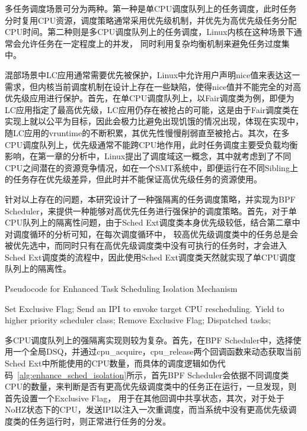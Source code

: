 多任务调度场景可分为两种。第一种是单CPU调度队列上的任务调度，此时任务分时复用CPU资源，调度策略通常采用优先级机制，并优先为高优先级任务分配CPU时间。第二种则是多CPU调度队列上的任务调度，Linux内核在这种场景下通常会允许任务在一定程度上的并发， 同时利用复杂均衡机制来避免任务过度集中。

混部场景中LC应用通常需要优先被保护，Linux中允许用户声明nice值来表达这一需求，但内核当前调度机制在设计上存在一些缺陷，使得nice值并不能完全的对高优先级应用进行保护。首先，在单CPU调度队列上，以Fair调度类为例，即便为LC应用指定了最高优先级，LC应用仍存在被抢占的可能，这是由于Fair调度类在实现上就以公平为目标，因此会极力比避免出现饥饿的情况出现，体现在实现中，随LC应用的vruntime的不断积累，其优先性慢慢削弱直至被抢占。其次，在多CPU调度队列上，优先级通常不能跨CPU地作用，此时任务调度主要受负载均衡影响，在第一章的分析中，Linux提出了调度域这一概念，其中就考虑到了不同CPU之间潜在的资源竞争情况，如在一个SMT系统中，即便运行在不同Sibling上的任务存在优先级差异，但此时并不能保证高优先级任务的资源使用。

针对以上存在的问题，本研究设计了一种强隔离的任务调度策略，并实现为BPF Scheduler，来提供一种能够对高优先任务进行强保护的调度策略。首先，对于单CPU队列上的隔离性问题，由于Sched Ext调度类本身优先级较低，结合第二章中对调度循环的分析可知，在每次调度循环中， 较高优先级调度类中的任务总是会被优先选中，而同时只有在高优先级调度类中没有可执行的任务时，才会进入Sched Ext调度类的流程中，因此使用Sched Ext调度类天然就实现了单CPU调度队列上的隔离性。


\begin{algorithm}
    \caption{Pseudocode for Enhanced Task Scheduling Isolation Mechanism}
    \label{alg:enhance_sched_isolation}
    \begin{algorithmic}[1]
            \State Set Exclusive Flag;
                \State Send an IPI to envoke target CPU rescheduling.
            \EndFor
            \State Yield to higher priority scheduler class;
        \EndIf
        \State Remove Exclusive Flag;
        \State Dispatched tasks;
    \EndWhile
    \end{algorithmic}
\end{algorithm}

多CPU调度队列上的强隔离实现则较为复杂。首先，在BPF Scheduler中，选择使用一个全局DSQ，并通过cpu\_acquire，cpu\_release两个回调函数来动态获取当前Sched Ext中所能使用的CPU数量，而具体的调度逻辑如伪代码~\ref{alg:enhance_sched_isolation}所示，首先BPF Scheduler会依据不同调度类CPU的数量，来判断是否有更高优先级调度类中的任务正在运行，一旦发现，则首先设置一个Exclusive Flag， 用于在其他回调中共享状态，其次，对于处于NoHZ状态下的CPU，发送IPI以注入一次重调度，而当系统中没有更高优先级调度类的任务运行时，则正常进行任务的分发。

